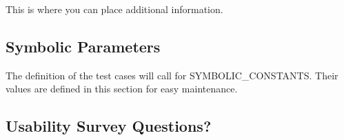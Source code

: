 \documentclass[12pt, titlepage]{article}
\begin{document}
This is where you can place additional information.

\subsection{Symbolic Parameters}

The definition of the test cases will call for SYMBOLIC\_CONSTANTS.
Their values are defined in this section for easy maintenance.

\subsection{Usability Survey Questions?}

\end{document}
